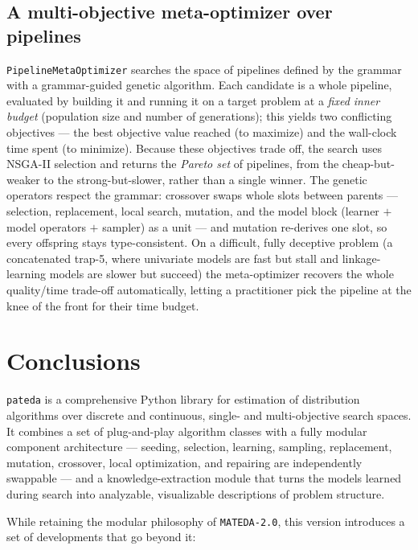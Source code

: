 \documentclass[a4paper,11pt]{article}
\begin{document}
\subsection{A multi-objective meta-optimizer over pipelines}

\texttt{PipelineMetaOptimizer} searches the space of pipelines defined by the grammar with a grammar-guided genetic algorithm.  Each candidate is a whole pipeline, evaluated by building it and running it on a target problem at a \emph{fixed inner budget} (population size and number of generations); this yields two conflicting objectives --- the best objective value reached (to maximize) and the wall-clock time spent (to minimize).  Because these objectives trade off, the search uses NSGA-II selection \citep{Deb_et_al:2002} and returns the \emph{Pareto set} of pipelines, from the cheap-but-weaker to the strong-but-slower, rather than a single winner.  The genetic operators respect the grammar: crossover swaps whole slots between parents --- selection, replacement, local search, mutation, and the model block (learner $+$ model operators $+$ sampler) as a unit --- and mutation re-derives one slot, so every offspring stays type-consistent.  On a difficult, fully deceptive problem (a concatenated trap-5, where univariate models are fast but stall and linkage-learning models are slower but succeed) the meta-optimizer recovers the whole quality/time trade-off automatically, letting a practitioner pick the pipeline at the knee of the front for their time budget.

\section{Conclusions}

\texttt{pateda} is a comprehensive Python library for estimation of distribution
algorithms over discrete and continuous, single- and multi-objective search
spaces. It combines a set of plug-and-play algorithm classes with a fully modular
component architecture --- seeding, selection, learning, sampling, replacement,
mutation, crossover, local optimization, and repairing are independently
swappable --- and a knowledge-extraction module that turns the models learned
during search into analyzable, visualizable descriptions of problem structure.

While retaining the modular philosophy of \texttt{MATEDA-2.0}, this version
introduces a set of developments that go beyond it:
\end{document}
